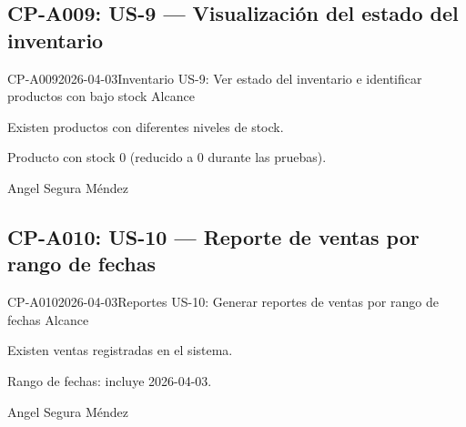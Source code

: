 \subsection{CP-A009: US-9 --- Visualización del estado del inventario}
\def\cpPasos{%
  \item Navegar a Inventario.
  \item Verificar que se ve el stock de todos los productos.
  \item Buscar indicadores visuales de stock bajo o agotado.}
\def\cpResultadoE{%
  \item El inventario muestra el stock actual y destaca visualmente los productos
        con poco stock.}
\def\cpResultadoO{El inventario muestra el stock de todos los productos correctamente.
  Sin embargo, \textcolor{rojo}{no existe indicador visual} para productos con stock
  bajo dentro del módulo de Inventario. El Dashboard sí muestra ``Stock Bajo: 0'' pero
  el módulo no diferencia visualmente los productos críticos. (Ver HAL-004)}
\casoprueba
  {CP-A009}{2026-04-03}{Inventario}
  {US-9: Ver estado del inventario e identificar productos con bajo stock}
  {Alcance}{\estadoParcial}
  {\item Existen productos con diferentes niveles de stock.}
  {\item Producto con stock 0 (reducido a 0 durante las pruebas).}
  {Angel Segura Méndez}

\subsection{CP-A010: US-10 --- Reporte de ventas por rango de fechas}
\def\cpPasos{%
  \item Navegar a Reportes.
  \item Seleccionar fecha inicio y fecha fin libremente.
  \item Generar reporte.}
\def\cpResultadoE{%
  \item El reporte muestra solo las ventas del rango seleccionado.}
\def\cpResultadoO{Las fechas de inicio y fin son seleccionables libremente. El reporte
  respetó el rango de fechas y mostró solo las ventas del período seleccionado.}
\casoprueba
  {CP-A010}{2026-04-03}{Reportes}
  {US-10: Generar reportes de ventas por rango de fechas}
  {Alcance}{\estadoAprobado}
  {\item Existen ventas registradas en el sistema.}
  {\item Rango de fechas: incluye 2026-04-03.}
  {Angel Segura Méndez}

